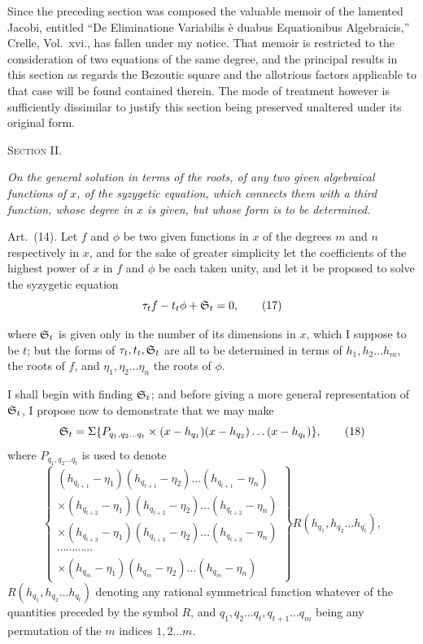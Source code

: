 \documentclass[11pt]{article}
\newcommand{\sourcepage}[1]{\marginpar{\scriptsize p.~#1}}
\newcommand{\art}[1]{\par\smallskip\noindent Art.~(#1).\quad}
\begin{document}
Since the preceding section was composed the valuable memoir of the lamented Jacobi, entitled ``De Eliminatione Variabilis è duabus Equationibus Algebraicis,'' Crelle, Vol.~xvi., has fallen under my notice. That memoir is restricted to the consideration of two equations of the same degree, and the principal results in this section as regards the Bezoutic square and the allotrious factors applicable to that case will be found contained therein. The mode of treatment however is sufficiently dissimilar to justify this section being preserved unaltered under its original form.

\begin{center}
{\scshape Section II.}\par\smallskip
{\itshape On the general solution in terms of the roots, of any two given algebraical functions of $x$, of the syzygetic equation, which connects them with a third function, whose degree in $x$ is given, but whose form is to be determined.}
\end{center}

\art{14} Let $f$ and $\phi$ be two given functions in $x$ of the degrees $m$ and $n$ respectively in $x$, and for the sake of greater simplicity let the coefficients of the highest power of $x$ in $f$ and $\phi$ be each taken unity, and let it be proposed to solve the syzygetic equation
\[
\tau_t f-t_t\phi+\mathfrak{S}_t=0,\tag{17}
\]

\sourcepage{459}
where $\mathfrak{S}_t$ is given only in the number of its dimensions in $x$, which I suppose to be $t$; but the forms of $\tau_t,t_t,\mathfrak{S}_t$ are all to be determined in terms of $h_1,h_2\ldots h_m$, the roots of $f$, and $\eta_1,\eta_2\ldots\eta_n$ the roots of $\phi$.

I shall begin with finding $\mathfrak{S}_t$; and before giving a more general representation of $\mathfrak{S}_t$, I propose now to demonstrate that we may make
\[
\mathfrak{S}_t=\Sigma\{P_{q_1,q_2\ldots q_t}\times(x-h_{q_1})(x-h_{q_2})\ldots(x-h_{q_t})\},\tag{18}
\]
where $P_{q_1,q_2\ldots q_t}$ is used to denote
\[
\left\{\begin{array}{c}
(h_{q_{t+1}}-\eta_1)(h_{q_{t+1}}-\eta_2)\ldots(h_{q_{t+1}}-\eta_n)\\
\times(h_{q_{t+2}}-\eta_1)(h_{q_{t+2}}-\eta_2)\ldots(h_{q_{t+2}}-\eta_n)\\
\times(h_{q_{t+3}}-\eta_1)(h_{q_{t+3}}-\eta_2)\ldots(h_{q_{t+3}}-\eta_n)\\
\cdots\cdots\cdots\cdots\\
\times(h_{q_m}-\eta_1)(h_{q_m}-\eta_2)\ldots(h_{q_m}-\eta_n)
\end{array}\right\}R(h_{q_1},h_{q_2}\ldots h_{q_t}),
\]
$R(h_{q_1},h_{q_2}\ldots h_{q_t})$ denoting any rational symmetrical function whatever of the quantities preceded by the symbol $R$, and $q_1,q_2\ldots q_t,q_{t+1}\ldots q_m$ being any permutation of the $m$ indices $1,2\ldots m$.
\end{document}
